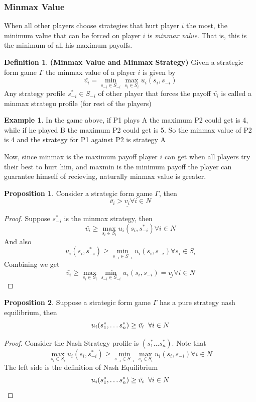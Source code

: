 \documentclass{article}
\theoremstyle{definition}
\newtheorem{defn}{Definition}[section]
\newtheorem{prop}{Proposition}[section]
\newtheorem{example}{Example}[section]
\begin{document}
\subsubsection{Minmax Value}
When all other players choose strategies that hurt player $i$ the most, the minimum value that can be forced on player $i$ is \textit{minmax value}. That is, this is the minimum of all his maximum payoffs.
\begin{defn}
\textbf{(Minmax Value and Minmax Strategy)} Given a strategic form game $\Gamma$ the minmax value of a player $i$ is given by $$\bar{v_i} = \min_{s_{-i}\in S_{-i}} \max_{s_i\in S_i} u_i(s_i, s_{-i})$$ Any strategy profile $s_{-i}^*\in S_{-i}$ of other player that forces the payoff $\bar{v_i}$ is called a minmax strategu profile (for rest of the players)
\end{defn}
\begin{example}
In the game above, if P1 plays A the maximum P2 could get is 4, while if he played B the maximum P2 could get is 5. So the minmax value of P2 is 4 and the strategy for P1 against P2 is strategy A
\end{example}
Now, since minmax is the maximum payoff player $i$ can get when all players try their best to hurt him, and maxmin is the minimum payoff the player can guarantee himself of recieving, naturally minmax value is greater.
\begin{prop}
\label{Minmax greater}
Consider a strategic form game $\Gamma$, then $$\bar{v_i} > \underline{v_i} \forall i \in N$$
\end{prop}
\begin{proof}
Suppose $s_{-i}^*$ is the minmax strategy, then $$\bar{v_i} \geq \max_{s_i\in S_i} u_i(s_i, s_{-i}^*) \forall i\in N$$ And also $$u_i(s_i,s_{-i}^*) \geq \min_{s_{-i}\in S_{-i}} u_i(s_i,s_{-i}) \forall s_i\in S_i$$ Combining we get $$\bar{v_i} \geq \max_{s_i\in S_i} \min_{s_{-i} \in S_{-i}} u_i(s_i, s_{-i}) = \underline{v_i} \forall i \in N$$
\end{proof}
\begin{prop}
Suppose a strategic form game $\Gamma$ has a pure strategy nash equilibrium, then $$u_i(s_1^*,\dots s_n^*) \geq \bar{v_i}\hspace{2mm} \forall i \in N$$
\end{prop}
\begin{proof}
Consider the Nash Strategy profile is $(s_1^* \dots s_n^*)$. Note that $$\max_{s_i\in S_i} u_i(s_i, s_{-i}^*) \geq \min_{s_{-i}\in S_{-i}} \max_{s_i\in S_i} u_i(s_i, s_{-i})\forall i \in N$$ The left side is the definition of Nash Equilibrium $$u_i(s_1^*,\dots s_n^*) \geq \bar{v_i}\hspace{2mm} \forall i \in N$$
\end{proof}
\end{document}
